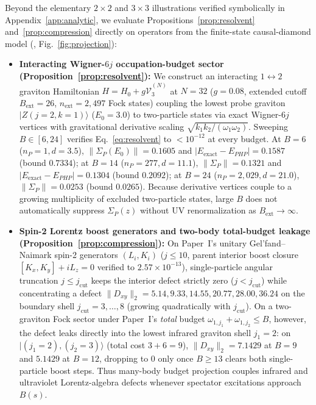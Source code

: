 \documentclass[11pt]{article}
\newcommand{\calV}{\mathcal{V}}
\begin{document}
Beyond the elementary $2\times 2$ and $3\times 3$ illustrations verified symbolically in Appendix~\ref{app:analytic}, we evaluate Propositions~\ref{prop:resolvent} and~\ref{prop:compression} directly on operators from the finite-state causal-diamond model (, Fig.~\ref{fig:projection}):

\begin{itemize}
\item \textbf{Interacting Wigner-$6j$ occupation-budget sector (Proposition~\ref{prop:resolvent}):} We construct an interacting $1\leftrightarrow 2$ graviton Hamiltonian $H = H_0 + g\widehat{\calV}_3^{(N)}$ at $N=32$ ($g=0.08$, extended cutoff $B_{\mathrm{ext}}=26$, $n_{\mathrm{ext}}=2{,}497$ Fock states) coupling the lowest probe graviton $|Z(j=2,k=1)\rangle$ ($E_0 = 3.0$) to two-particle states via exact Wigner-$6j$ vertices with gravitational derivative scaling $\sqrt{k_1 k_2 / (\omega_1\omega_2)}$. Sweeping $B \in [6, 24]$ verifies Eq.~\eqref{eq:resolvent} to $<10^{-12}$ at every budget. At $B=6$ ($n_P=1, d=3.5$), $\|\Sigma_P(E_0)\| = 0.1605$ and $|E_{\mathrm{exact}} - E_{PHP}| = 0.1587$ (bound $0.7334$); at $B=14$ ($n_P=277, d=11.1$), $\|\Sigma_P\| = 0.1321$ and $|E_{\mathrm{exact}} - E_{PHP}| = 0.1304$ (bound $0.2092$); at $B=24$ ($n_P=2{,}029, d=21.0$), $\|\Sigma_P\| = 0.0253$ (bound $0.0265$). Because derivative vertices couple to a growing multiplicity of excluded two-particle states, large $B$ does not automatically suppress $\Sigma_P(z)$ without UV renormalization as $B_{\mathrm{ext}}\to\infty$.

\item \textbf{Spin-2 Lorentz boost generators and two-body total-budget leakage (Proposition~\ref{prop:compression}):} On Paper~I's unitary Gel'fand--Naimark spin-2 generators $(L_i, K_i)$ ($j \le 10$, parent interior boost closure $[K_x, K_y] + iL_z = 0$ verified to $2.57\times 10^{-13}$), single-particle angular truncation $j \le j_{\mathrm{cut}}$ keeps the interior defect strictly zero ($j < j_{\mathrm{cut}}$) while concentrating a defect $\|D_{xy}\|_2 = 5.14, 9.33, 14.55, 20.77, 28.00, 36.24$ on the boundary shell $j_{\mathrm{cut}} = 3,\dots,8$ (growing quadratically with $j_{\mathrm{cut}}$). On a two-graviton Fock sector under Paper~I's \emph{total} budget $\omega_{1,j_1} + \omega_{1,j_2} \le B$, however, the defect leaks directly into the lowest infrared graviton shell $j_1=2$: on $|(j_1=2),(j_2=3)\rangle$ (total cost $3+6=9$), $\|D_{xy}\|_2 = 7.1429$ at $B=9$ and $5.1429$ at $B=12$, dropping to $0$ only once $B \ge 13$ clears both single-particle boost steps. Thus many-body budget projection couples infrared and ultraviolet Lorentz-algebra defects whenever spectator excitations approach $B(s)$.
\end{itemize}
\end{document}
